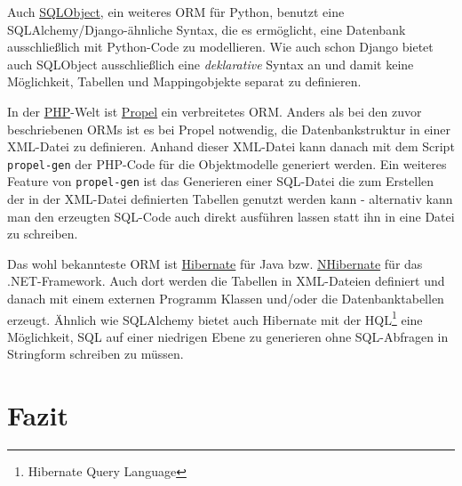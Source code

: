 Auch \href{http://www.sqlobject.org}{SQLObject}, ein weiteres ORM für Python,
benutzt eine SQLAlchemy/Django-ähnliche Syntax, die es ermöglicht, eine
Datenbank ausschließlich mit Python-Code zu modellieren. Wie auch schon Django
bietet auch SQLObject ausschließlich eine \emph{deklarative} Syntax an und damit
keine Möglichkeit, Tabellen und Mappingobjekte separat zu definieren.

In der \href{http://www.php.net}{PHP}-Welt ist
\href{http://www.propelorm.org}{Propel} ein verbreitetes ORM. Anders als bei den
zuvor beschriebenen ORMs ist es bei Propel notwendig, die Datenbankstruktur in
einer XML-Datei zu definieren. Anhand dieser XML-Datei kann danach mit dem
Script \texttt{propel-gen} der PHP-Code für die Objektmodelle generiert werden.
Ein weiteres Feature von \texttt{propel-gen} ist das Generieren einer SQL-Datei
die zum Erstellen der in der XML-Datei definierten Tabellen genutzt werden kann
- alternativ kann man den erzeugten SQL-Code auch direkt ausführen lassen statt
ihn in eine Datei zu schreiben.

Das wohl bekannteste ORM ist \href{http://www.hibernate.org/}{Hibernate} für
Java bzw. \href{http://nhforge.org/}{NHibernate} für das .NET-Framework. Auch
dort werden die Tabellen in XML-Dateien definiert und danach mit einem externen
Programm Klassen und/oder die Datenbanktabellen erzeugt. Ähnlich wie SQLAlchemy
bietet auch Hibernate mit der HQL\footnote{Hibernate Query Language} eine
Möglichkeit, SQL auf einer niedrigen Ebene zu generieren ohne SQL-Abfragen in
Stringform schreiben zu müssen.

\section{Fazit}
